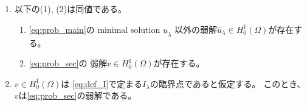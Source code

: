 \begin{lem} \label{lem:rel_heart_spade}
 \begin{enumerate}[1.]
  \item 以下の(1), (2)は同値である。
        \begin{enumerate}[(1)]
         \item \ref{eq:prob_main}の minimal solution $\underline{u}_\lambda$
               以外の弱解$\bar{u}_\lambda \in H_0^1(\Omega)$が存在する。
         \item \ref{eq:prob_sec}の
               弱解$v \in H_0^1(\Omega)$が存在する。
        \end{enumerate}
  \item $v \in H_0^1(\Omega)$は
        \eqref{eq:def_I}で定まる$I_\lambda$の臨界点であると仮定する。
        このとき、$v$は\ref{eq:prob_sec}の弱解である。
 \end{enumerate}
\end{lem}


